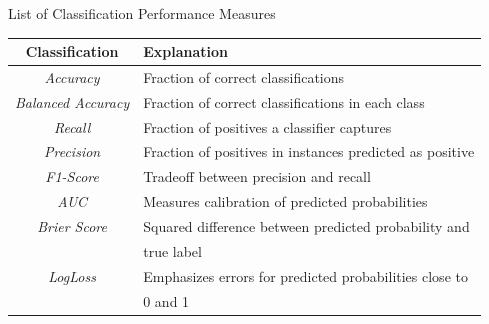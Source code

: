 \documentclass[11pt,compress,t,notes=noshow, xcolor=table]{beamer}
\begin{document}
\begin{vbframe}{List of Classification Performance Measures}

\small

\begin{center}
\begin{tabular}{c l}
\hline

 \textbf{Classification}     & \textbf{Explanation}                                               \\
\hline
 \textit{Accuracy}           &  Fraction of correct classifications                               \\
 \textit{Balanced Accuracy}  &  Fraction of correct classifications in each class                 \\
 \textit{Recall}             &  Fraction of positives a classifier captures                       \\
 \textit{Precision}          &  Fraction of positives in instances predicted as positive          \\
 \textit{F1-Score}           &  Tradeoff between precision and recall                             \\
 \textit{AUC}                &  Measures calibration of predicted probabilities                   \\
 \textit{Brier Score}        &  Squared difference between predicted probability and  \\
  & true label   \\
 \textit{LogLoss}            &  Emphasizes errors for predicted probabilities close to \\
 & 0 and 1    \\
\hline
\end{tabular}
\end{center}

\normalsize

\end{vbframe}

\end{document}
